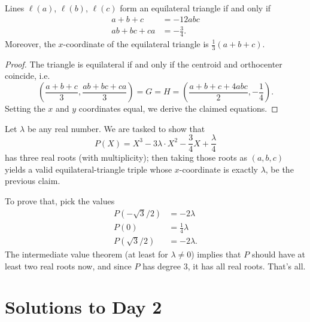 \documentclass[11pt]{scrartcl}
\begin{document}
\begin{claim*}
  Lines $\ell(a)$, $\ell(b)$, $\ell(c)$
  form an equilateral triangle if and only if
  \begin{align*}
    a+b+c &= -12abc \\
    ab+bc+ca &= -\frac34.
  \end{align*}
  Moreover, the $x$-coordinate of the equilateral triangle is $\frac13(a+b+c)$.
\end{claim*}
\begin{proof}
  The triangle is equilateral if and only if the centroid and orthocenter coincide, i.e.
  \[ \left( \frac{a+b+c}{3}, \frac{ab+bc+ca}{3} \right) = G = H =
    \left( \frac{a+b+c+4abc}{2}, -\frac14 \right). \]
  Setting the $x$ and $y$ coordinates equal,
  we derive the claimed equations.
\end{proof}

Let $\lambda$ be any real number.
We are tasked to show that
\[ P(X) = X^3 - 3\lambda \cdot X^2 - \frac34 X + \frac{\lambda}{4} \]
has three real roots (with multiplicity);
then taking those roots as $(a,b,c)$
yields a valid equilateral-triangle triple
whose $x$-coordinate is exactly $\lambda$, be the previous claim.

To prove that, pick the values
\begin{align*}
  P(-\sqrt{3}/2) &= -2\lambda \\
  P(0) &= \tfrac14 \lambda \\
  P(\sqrt{3}/2) &= -2\lambda.
\end{align*}
The intermediate value theorem
(at least for $\lambda \neq 0$) implies that $P$
should have at least two real roots now,
and since $P$ has degree $3$, it has all real roots.
That's all.
\pagebreak

\section{Solutions to Day 2}
\end{document}
